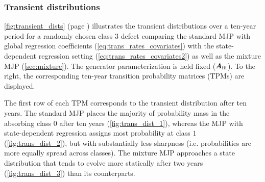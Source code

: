 \documentclass{article}
\newcommand{\RN}[1]{\textup{\uppercase\expandafter{\romannumeral#1}}}
\begin{document}
\subsubsection{Transient distributions}

\cref{fig:transient_dists} (page \pageref{fig:transient_dists}) illustrates the transient distributions over a ten-year period for a randomly chosen class $3$ defect
comparing the standard MJP with global regression coefficients (\cref{eq:trans_rates_covariates}) with the state-dependent regression setting (\cref{eq:trans_rates_covariates2}) as well as the mixture MJP (\cref{sec:mixture}). The generator parameterization is held fixed ($\bm{A}_{\RN{3}}$). To the right, the corresponding ten-year transition probability matrices (TPMs) are displayed.



The first row of each TPM corresponds to the transient distribution after ten years. 
The standard MJP places the majority of probability mass in the absorbing class $0$ after ten years (\cref{fig:trans_dist_1}), whereas the MJP with state-dependent regression assigns most probability at class $1$ (\cref{fig:trans_dist_2}), but with substantially less sharpness (i.e. probabilities are more equally spread across classes). The mixture MJP approaches a state distribution that tends to evolve more statically after two years (\cref{fig:trans_dist_3}) than its counterparts.
\end{document}
